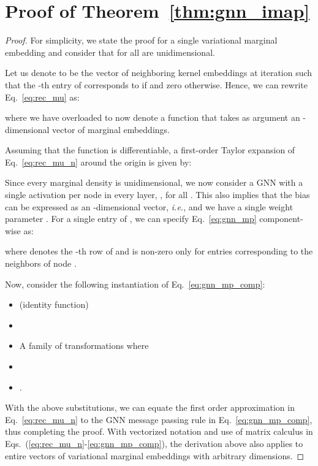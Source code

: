 \documentclass{article}
\begin{document}
\section{Proof of Theorem~\ref{thm:gnn_imap}}\label{app:enc}
\begin{proof}
For simplicity, we state the proof for a single variational marginal embedding  and consider that  for all  are unidimensional. 

Let us denote  to be the vector of neighboring kernel embeddings at iteration  such that the -th entry of  corresponds to  if  and zero otherwise.  Hence, we can rewrite Eq.~\eqref{eq:rec_mu} as:

where we have overloaded  to now denote a function that takes as argument an -dimensional vector of marginal embeddings.

Assuming that the function  is differentiable, a first-order Taylor expansion of Eq.~\eqref{eq:rec_mu_n} around the origin  is given by:



Since every marginal density is unidimensional, we now consider a GNN with a single activation per node in every layer, ,   for all . 
 This also implies that the bias can be expressed as an  -dimensional vector, \textit{i.e.},  and we have a single weight parameter .
For a single entry of , we can specify Eq.~\eqref{eq:gnn_mp} component-wise as:

where  denotes the -th row of  and is non-zero only for entries corresponding to the neighbors of node .

Now, consider the following instantiation of Eq.~\eqref{eq:gnn_mp_comp}:
\begin{itemize}
\item  (identity function)
\item 
\item A family of  transformations  where 
\item 
\item .
\end{itemize}

With the above substitutions, we can equate the first order approximation in Eq.~\eqref{eq:rec_mu_n} to the GNN message passing rule in Eq.~\eqref{eq:gnn_mp_comp}, thus completing the proof. With vectorized notation and use of matrix calculus in Eqs.~(\ref{eq:rec_mu_n}-\ref{eq:gnn_mp_comp}), the derivation above also applies to entire vectors of variational marginal embeddings with arbitrary dimensions.
\end{proof}
\end{document}
